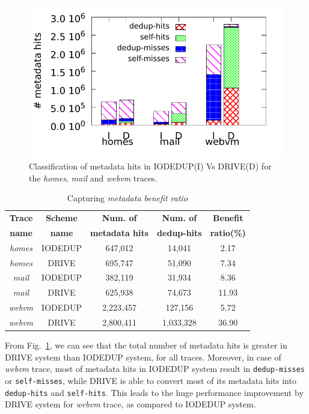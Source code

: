 \begin{figure}
    \centering
    \includegraphics[scale=0.85]{confided-figures/metadata-conversions/reads-writes/metadataconversions-reads-n-writes.pdf}
    \caption{Classification of metadata hits in IODEDUP(I) Vs DRIVE(D) for the \textit{homes}, \textit{mail} and \textit{webvm} traces.}
    \label{fig:metadata-conversions}
\end{figure}

\begin{table}[t]
	\caption{Capturing \textit{metadata benefit ratio}}
	\label{tab:metadata-benefits}
	\centering
	\begin{tabular}{|c|c|c|c|c|} \hline
		\textbf{Trace} & \textbf{Scheme} & \textbf{Num. of} & \textbf{Num. of} & \textbf{Benefit} \\
			  \textbf{name} & \textbf{name} & \textbf{metadata hits} & \textbf{dedup-hits} & \textbf{ratio(\%)} \\ \hline
		\textit{homes} & IODEDUP & 647,012 & 14,041 & 2.17 \\ \hline
	   	\textit{homes} & DRIVE & 695,747 & 51,090 & 7.34 \\ \hline
		\textit{mail} & IODEDUP & 382,119 & 31,934 & 8.36 \\ \hline
		\textit{mail} & DRIVE & 625,938 & 74,673 & 11.93 \\ \hline
	    \textit{webvm} & IODEDUP & 2,223,457 & 127,156 & 5.72 \\ \hline
		\textit{webvm} & DRIVE & 2,800,411 & 1,033,328 & 36.90 \\ \hline
	\end{tabular}
\end{table}

From Fig.~\ref{fig:metadata-conversions}, we can see that the total number
of metadata hits is greater in DRIVE system than IODEDUP system, for all traces.
Moreover, in case of \textit{webvm} trace, most of metadata hits in IODEDUP
system result in \texttt{dedup-misses} or \texttt{self-misses}, while
DRIVE is able to convert most of its metadata hits into \texttt{dedup-hits}
and \texttt{self-hits}. This leads to the huge performance improvement
by DRIVE system for \textit{webvm} trace, as compared to IODEDUP system.

